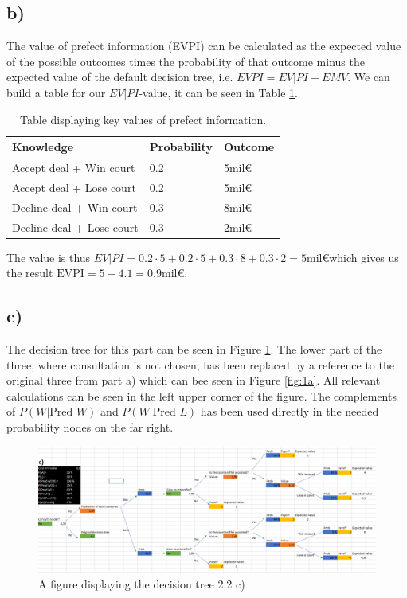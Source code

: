 \documentclass{article}
\begin{document}
\subsection{b)}
	The value of prefect information (EVPI) can be calculated as the expected value of the possible outcomes times the probability of that outcome minus the expected value of the default decision tree, i.e. $EVPI = EV|PI - EMV$.
	We can build a table for our $EV|PI$-value, it can be seen in Table \ref{tab:2b}.
	\begin{table}[h]
		\centering
		\caption{Table displaying key values of prefect information. }
		\label{tab:2b}
		\begin{tabular}{l|l|l}
			Knowledge                 & Probability & Outcome \\ \hline
			Accept deal + Win court   & 0.2         & 5mil\euro   \\
			Accept deal + Lose court  & 0.2         & 5mil\euro   \\
			Decline deal + Win court  & 0.3         & 8mil\euro   \\
			Decline deal + Lose court & 0.3         & 2mil\euro  
		\end{tabular}
	\end{table}
	The value is thus $EV|PI = 0.2\cdot5+0.2\cdot5+0.3\cdot8+0.3\cdot2 = 5$mil\euro which gives us the result $\text{EVPI} = 5 - 4.1 = 0.9$mil\euro.
\subsection{c)}
	The decision tree for this part can be seen in Figure \ref{fig:2c}. The lower part of the three, where consultation is not chosen, has been replaced by a reference to the original three from part a) which can bee seen in Figure \ref{fig:1a}. All relevant calculations can be seen in the left upper corner of the figure. The complements of $P(W|\text{Pred } W)$ and $P(W|\text{Pred } L)$ has been used directly in the needed probability nodes on the far right. 
	\begin{figure}[H]
		\includegraphics[width=\textwidth]{2c.png}
		\caption{A figure displaying the decision tree 2.2 c)}
		\label{fig:2c}
	\end{figure}
\end{document}
